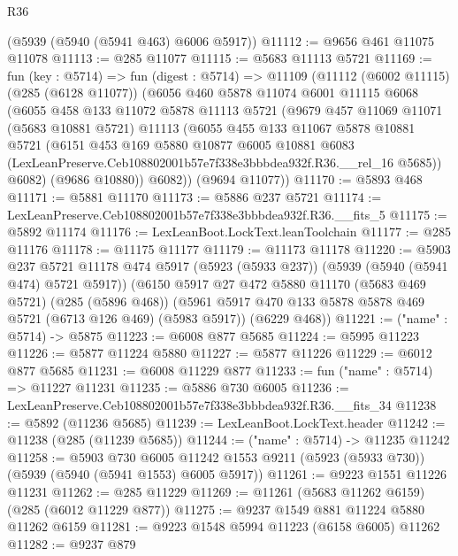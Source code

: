 \begin{lexlean}{R36}
\begin{coremodule}
    (@5939 (@5940 (@5941 @463) @6006 @5917))
@11112 := @9656 @461 @11075 @11078
@11113 := @285 @11077
@11115 := @5683 @11113 @5721
@11169 := fun (key : @5714) =>
  fun (digest : @5714) =>
  @11109
    (@11112
      (@6002 @11115)
      (@285 (@6128 @11077))
      (@6056
        @460
        @5878
        @11074
        @6001
        @11115
        @6068
        (@6055
          @458
          @133
          @11072
          @5878
          @11113
          @5721
          (@9679
            @457
            @11069
            @11071
            (@5683 @10881 @5721)
            @11113
            (@6055
              @455
              @133
              @11067
              @5878
              @10881
              @5721
              (@6151
                @453
                @169
                @5880
                @10877
                @6005
                @10881
                @6083
                (LexLeanPreserve.Ceb108802001b57e7f338e3bbbdea932f.R36.__rel_16 @5685))
              @6082)
            (@9686 @10880))
          @6082))
      (@9694 @11077))
@11170 := @5893 @468
@11171 := @5881 @11170
@11173 := @5886 @237 @5721
@11174 := LexLeanPreserve.Ceb108802001b57e7f338e3bbbdea932f.R36.__fits_5
@11175 := @5892 @11174
@11176 := LexLeanBoot.LockText.leanToolchain
@11177 := @285 @11176
@11178 := @11175 @11177
@11179 := @11173 @11178
@11220 := @5903
    @237
    @5721
    @11178
    @474
    @5917
    (@5923 (@5933 @237))
    (@5939 (@5940 (@5941 @474) @5721 @5917))
    (@6150
      @5917
      @27
      @472
      @5880
      @11170
      (@5683 @469 @5721)
      (@285 (@5896 @468))
      (@5961 @5917 @470 @133 @5878 @5878 @469 @5721 (@6713 @126 @469) (@5983 @5917))
      (@6229 @468))
@11221 := ("name" : @5714) -> @5875
@11223 := @6008 @877 @5685
@11224 := @5995 @11223
@11226 := @5877 @11224 @5880
@11227 := @5877 @11226
@11229 := @6012 @877 @5685
@11231 := @6008 @11229 @877
@11233 := fun ("name" : @5714) => @11227 @11231
@11235 := @5886 @730 @6005
@11236 := LexLeanPreserve.Ceb108802001b57e7f338e3bbbdea932f.R36.__fits_34
@11238 := @5892 (@11236 @5685)
@11239 := LexLeanBoot.LockText.header
@11242 := @11238 (@285 (@11239 @5685))
@11244 := ("name" : @5714) -> @11235 @11242
@11258 := @5903
    @730
    @6005
    @11242
    @1553
    @9211
    (@5923 (@5933 @730))
    (@5939 (@5940 (@5941 @1553) @6005 @5917))
@11261 := @9223 @1551 @11226 @11231
@11262 := @285 @11229
@11269 := @11261 (@5683 @11262 @6159) (@285 (@6012 @11229 @877))
@11275 := @9237 @1549 @881 @11224 @5880 @11262 @6159
@11281 := @9223 @1548 @5994 @11223 (@6158 @6005) @11262
@11282 := @9237 @879

\end{coremodule}
\end{lexlean}
